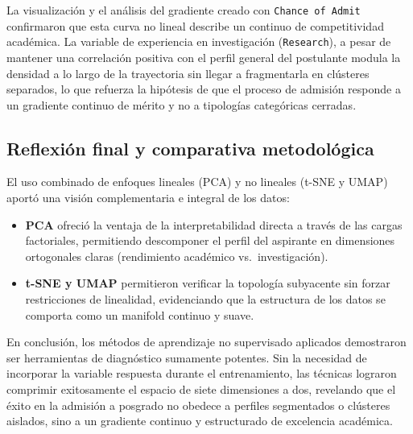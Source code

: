 \documentclass[
  10pt,
  a4paper]{article}
\providecommand{\tightlist}{%
  \setlength{\itemsep}{0pt}\setlength{\parskip}{0pt}}
\begin{document}
La visualización y el análisis del gradiente creado con \texttt{Chance\ of\ Admit} confirmaron que esta curva no lineal describe un continuo de competitividad académica. La variable de experiencia en investigación (\texttt{Research}), a pesar de mantener una correlación positiva con el perfil general del postulante modula la densidad a lo largo de la trayectoria sin llegar a fragmentarla en clústeres separados, lo que refuerza la hipótesis de que el proceso de admisión responde a un gradiente continuo de mérito y no a tipologías categóricas cerradas.

\subsection{Reflexión final y comparativa metodológica}\label{reflexiuxf3n-final-y-comparativa-metodoluxf3gica}

El uso combinado de enfoques lineales (PCA) y no lineales (t-SNE y UMAP) aportó una visión complementaria e integral de los datos:

\begin{itemize}
\tightlist
\item
  \textbf{PCA} ofreció la ventaja de la interpretabilidad directa a través de las cargas factoriales, permitiendo descomponer el perfil del aspirante en dimensiones ortogonales claras (rendimiento académico vs.~investigación).
\item
  \textbf{t-SNE y UMAP} permitieron verificar la topología subyacente sin forzar restricciones de linealidad, evidenciando que la estructura de los datos se comporta como un manifold continuo y suave.
\end{itemize}

En conclusión, los métodos de aprendizaje no supervisado aplicados demostraron ser herramientas de diagnóstico sumamente potentes. Sin la necesidad de incorporar la variable respuesta durante el entrenamiento, las técnicas lograron comprimir exitosamente el espacio de siete dimensiones a dos, revelando que el éxito en la admisión a posgrado no obedece a perfiles segmentados o clústeres aislados, sino a un gradiente continuo y estructurado de excelencia académica.
\end{document}
